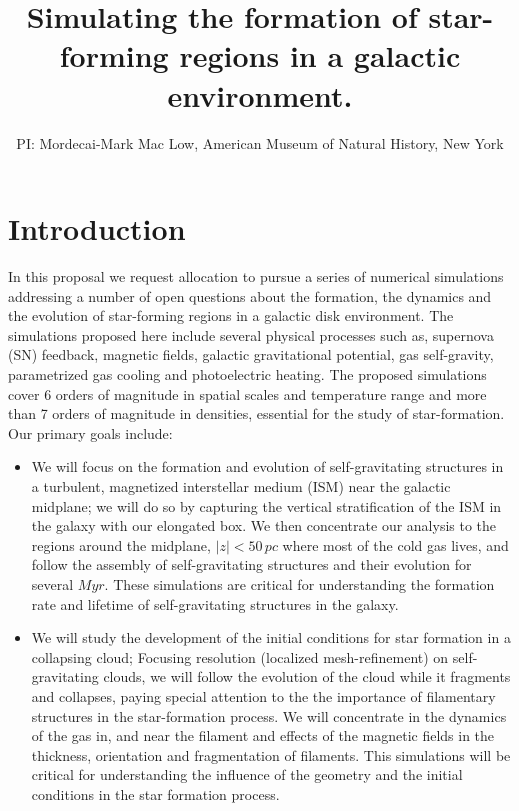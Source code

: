 \documentclass[12pt,a4paper]{article}
\begin{document}
\author{PI: Mordecai-Mark Mac Low, American Museum of Natural History, New York}
\title{Simulating the formation of star-forming regions in a galactic environment.}


\section{Introduction}

In this proposal we request allocation to pursue a series of numerical simulations addressing a number of open questions about the formation, the dynamics and the evolution of star-forming regions in a galactic disk environment.
The simulations proposed here include several physical processes such as, supernova (SN) feedback, magnetic fields, galactic gravitational potential, gas self-gravity, parametrized gas cooling and photoelectric heating. 
The proposed simulations cover 6 orders of magnitude in spatial scales and temperature range and more than 7 orders of magnitude in densities, essential for the study of star-formation. 
Our primary goals include:

\begin{itemize}

	\item We will focus on the formation and evolution of self-gravitating structures in a turbulent, magnetized interstellar medium (ISM) near the galactic midplane; we will do so by capturing the vertical stratification of the ISM in the galaxy with our elongated box. 
	We then concentrate our analysis to the regions around the midplane, $|z| < 50 \, pc$ where most of the cold gas lives, and follow the assembly of self-gravitating structures and their evolution for several $Myr$. 
	These simulations are critical for understanding the formation rate and lifetime of self-gravitating structures in the galaxy.
	
	\item We will study the development of the initial conditions for star formation in a collapsing cloud; Focusing resolution (localized mesh-refinement) on self-gravitating clouds, we will follow the evolution of the cloud while it fragments and collapses, paying special attention to the the importance of filamentary structures in the star-formation process. 
	We will concentrate in the dynamics of the gas in, and near the filament and effects of the magnetic fields in the thickness, orientation and fragmentation of filaments. 
	This simulations will be critical for understanding the influence of the geometry and the initial conditions in the star formation process.
	
\end{itemize}
\end{document}
